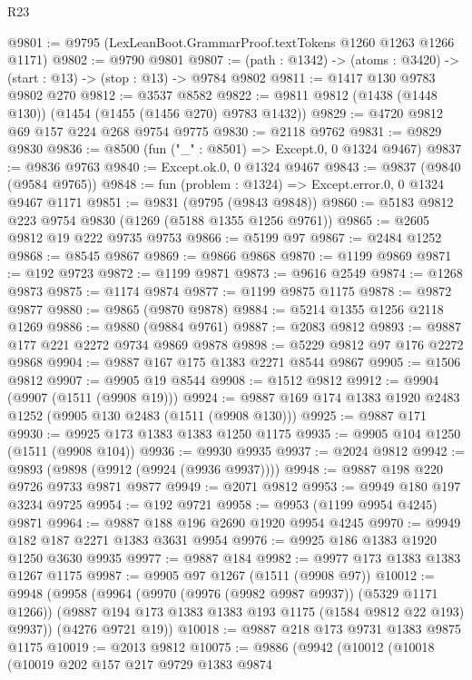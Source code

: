 \begin{lexlean}{R23}
\begin{coremodule}
@9801 := @9795 (LexLeanBoot.GrammarProof.textTokens @1260 @1263 @1266 @1171)
@9802 := @9790 @9801
@9807 := (path : @1342) -> (atoms : @3420) -> (start : @13) -> (stop : @13) -> @9784 @9802
@9811 := @1417 @130 @9783 @9802 @270
@9812 := @3537 @8582
@9822 := @9811 @9812 (@1438 (@1448 @130)) (@1454 (@1455 (@1456 @270) @9783 @1432))
@9829 := @4720 @9812 @69 @157 @224 @268 @9754 @9775
@9830 := @2118 @9762
@9831 := @9829 @9830
@9836 := @8500 (fun ("_" : @8501) => Except.{0, 0} @1324 @9467)
@9837 := @9836 @9763
@9840 := Except.ok.{0, 0} @1324 @9467
@9843 := @9837 (@9840 (@9584 @9765))
@9848 := fun (problem : @1324) => Except.error.{0, 0} @1324 @9467 @1171
@9851 := @9831 (@9795 (@9843 @9848))
@9860 := @5183 @9812 @223 @9754 @9830 (@1269 (@5188 @1355 @1256 @9761))
@9865 := @2605 @9812 @19 @222 @9735 @9753
@9866 := @5199 @97
@9867 := @2484 @1252
@9868 := @8545 @9867
@9869 := @9866 @9868
@9870 := @1199 @9869
@9871 := @192 @9723
@9872 := @1199 @9871
@9873 := @9616 @2549
@9874 := @1268 @9873
@9875 := @1174 @9874
@9877 := @1199 @9875 @1175
@9878 := @9872 @9877
@9880 := @9865 (@9870 @9878)
@9884 := @5214 @1355 @1256 @2118 @1269
@9886 := @9880 (@9884 @9761)
@9887 := @2083 @9812
@9893 := @9887 @177 @221 @2272 @9734 @9869 @9878
@9898 := @5229 @9812 @97 @176 @2272 @9868
@9904 := @9887 @167 @175 @1383 @2271 @8544 @9867
@9905 := @1506 @9812
@9907 := @9905 @19 @8544
@9908 := @1512 @9812
@9912 := @9904 (@9907 (@1511 (@9908 @19)))
@9924 := @9887 @169 @174 @1383 @1920 @2483 @1252 (@9905 @130 @2483 (@1511 (@9908 @130)))
@9925 := @9887 @171
@9930 := @9925 @173 @1383 @1383 @1250 @1175
@9935 := @9905 @104 @1250 (@1511 (@9908 @104))
@9936 := @9930 @9935
@9937 := @2024 @9812
@9942 := @9893 (@9898 (@9912 (@9924 (@9936 @9937))))
@9948 := @9887 @198 @220 @9726 @9733 @9871 @9877
@9949 := @2071 @9812
@9953 := @9949 @180 @197 @3234 @9725
@9954 := @192 @9721
@9958 := @9953 (@1199 @9954 @4245) @9871
@9964 := @9887 @188 @196 @2690 @1920 @9954 @4245
@9970 := @9949 @182 @187 @2271 @1383 @3631 @9954
@9976 := @9925 @186 @1383 @1920 @1250 @3630 @9935
@9977 := @9887 @184
@9982 := @9977 @173 @1383 @1383 @1267 @1175
@9987 := @9905 @97 @1267 (@1511 (@9908 @97))
@10012 := @9948
    (@9958
      (@9964
        (@9970 (@9976 (@9982 @9987 @9937)) (@5329 @1171 @1266))
        (@9887 @194 @173 @1383 @1383 @193 @1175 (@1584 @9812 @22 @193) @9937))
      (@4276 @9721 @19))
@10018 := @9887 @218 @173 @9731 @1383 @9875 @1175
@10019 := @2013 @9812
@10075 := @9886
    (@9942
      (@10012
        (@10018
          (@10019
            @202
            @157
            @217
            @9729
            @1383
            @9874

\end{coremodule}
\end{lexlean}
